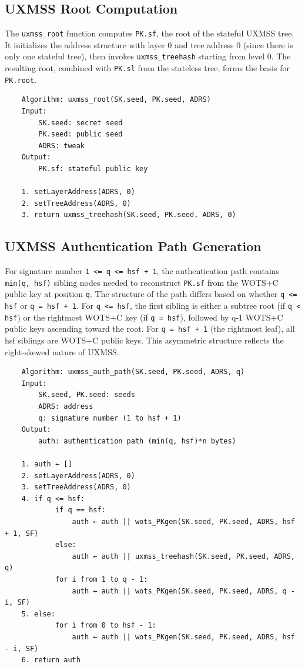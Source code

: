 \subsection{UXMSS Root Computation}
The \texttt{uxmss\_root} function computes \texttt{PK.sf}, the root of the stateful UXMSS tree. It initializes the address structure with layer 0 and tree address 0 (since there is only one stateful tree), then invokes \texttt{uxmss\_treehash} starting from level 0. The resulting root, combined with \texttt{PK.sl} from the stateless tree, forms the basis for \texttt{PK.root}.
\begin{verbatim}
    Algorithm: uxmss_root(SK.seed, PK.seed, ADRS)
    Input:
        SK.seed: secret seed
        PK.seed: public seed
        ADRS: tweak
    Output:
        PK.sf: stateful public key

    1. setLayerAddress(ADRS, 0)
    2. setTreeAddress(ADRS, 0)
    3. return uxmss_treehash(SK.seed, PK.seed, ADRS, 0)
\end{verbatim}

\subsection{UXMSS Authentication Path Generation}
For signature number \texttt{1 <= q <= hsf + 1}, the authentication path contains \texttt{min(q, hsf)} sibling nodes needed to reconstruct \texttt{PK.sf} from the WOTS+C public key at position \texttt{q}. The structure of the path differs based on whether \texttt{q <= hsf} or \texttt{q = hsf + 1}. For \texttt{q <= hsf}, the first sibling is either a subtree root (if \texttt{q < hsf}) or the rightmost WOTS+C key (if \texttt{q = hsf}), followed by q-1 WOTS+C public keys ascending toward the root. For \texttt{q = hsf + 1} (the rightmost leaf), all hsf siblings are WOTS+C public keys. This asymmetric structure reflects the right-skewed nature of UXMSS.

\begin{verbatim}
    Algorithm: uxmss_auth_path(SK.seed, PK.seed, ADRS, q)
    Input:
        SK.seed, PK.seed: seeds
        ADRS: address
        q: signature number (1 to hsf + 1)
    Output:
        auth: authentication path (min(q, hsf)*n bytes)

    1. auth ← []
    2. setLayerAddress(ADRS, 0)
    3. setTreeAddress(ADRS, 0)
    4. if q <= hsf:
            if q == hsf:
                auth ← auth || wots_PKgen(SK.seed, PK.seed, ADRS, hsf + 1, SF)
            else:
                auth ← auth || uxmss_treehash(SK.seed, PK.seed, ADRS, q)  
            for i from 1 to q - 1:
                auth ← auth || wots_PKgen(SK.seed, PK.seed, ADRS, q - i, SF)
    5. else:  
            for i from 0 to hsf - 1:
                auth ← auth || wots_PKgen(SK.seed, PK.seed, ADRS, hsf - i, SF)
    6. return auth
\end{verbatim}
